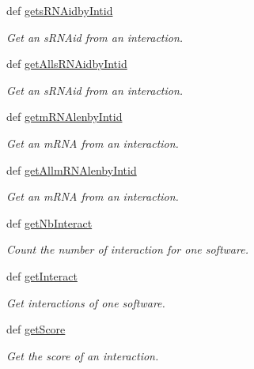 \begin{DoxyCompactItemize}
def \hyperlink{classirna_1_1iRNA__stat_1_1Sqlite__manager_1_1Sqlite__manager_a56dc7e2600710ffdb6bc385c887e5ec9}{gets\-R\-N\-Aidby\-Intid}
\begin{DoxyCompactList}\small\item\em \-Get an s\-R\-N\-Aid from an interaction. \end{DoxyCompactList}\item 
def \hyperlink{classirna_1_1iRNA__stat_1_1Sqlite__manager_1_1Sqlite__manager_a12f15331fb945941f29fa5fd0513e51b}{get\-Alls\-R\-N\-Aidby\-Intid}
\begin{DoxyCompactList}\small\item\em \-Get an s\-R\-N\-Aid from an interaction. \end{DoxyCompactList}\item 
def \hyperlink{classirna_1_1iRNA__stat_1_1Sqlite__manager_1_1Sqlite__manager_a69f5865c823d21676225411f7a77cff9}{getm\-R\-N\-Alenby\-Intid}
\begin{DoxyCompactList}\small\item\em \-Get an m\-R\-N\-A from an interaction. \end{DoxyCompactList}\item 
def \hyperlink{classirna_1_1iRNA__stat_1_1Sqlite__manager_1_1Sqlite__manager_afd8ab3c392fef0df4d3ee5f45896e1c1}{get\-Allm\-R\-N\-Alenby\-Intid}
\begin{DoxyCompactList}\small\item\em \-Get an m\-R\-N\-A from an interaction. \end{DoxyCompactList}\item 
def \hyperlink{classirna_1_1iRNA__stat_1_1Sqlite__manager_1_1Sqlite__manager_a7a13db3fbdaf4d69e4c3cbb8de74b744}{get\-Nb\-Interact}
\begin{DoxyCompactList}\small\item\em \-Count the number of interaction for one software. \end{DoxyCompactList}\item 
def \hyperlink{classirna_1_1iRNA__stat_1_1Sqlite__manager_1_1Sqlite__manager_af54dc0bba33449fe7d0c6503fb1b756c}{get\-Interact}
\begin{DoxyCompactList}\small\item\em \-Get interactions of one software. \end{DoxyCompactList}\item 
def \hyperlink{classirna_1_1iRNA__stat_1_1Sqlite__manager_1_1Sqlite__manager_af446d70c91bedcf73538151670c0564b}{get\-Score}
\begin{DoxyCompactList}\small\item\em \-Get the score of an interaction. \end{DoxyCompactList}\item 

\end{DoxyCompactItemize}
